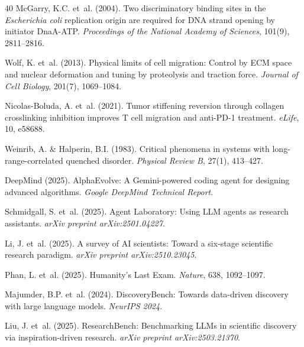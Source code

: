 \documentclass[11pt]{article}
\begin{document}
\begin{thebibliography}{40}
McGarry, K.C. et~al. (2004).
Two discriminatory binding sites in the \textit{Escherichia coli} replication origin are required for DNA strand opening by initiator DnaA-ATP.
\emph{Proceedings of the National Academy of Sciences}, 101(9), 2811--2816.

Wolf, K. et~al. (2013).
Physical limits of cell migration: Control by ECM space and nuclear deformation and tuning by proteolysis and traction force.
\emph{Journal of Cell Biology}, 201(7), 1069--1084.

Nicolas-Boluda, A. et~al. (2021).
Tumor stiffening reversion through collagen crosslinking inhibition improves T cell migration and anti-PD-1 treatment.
\emph{eLife}, 10, e58688.

Weinrib, A. \& Halperin, B.I. (1983).
Critical phenomena in systems with long-range-correlated quenched disorder.
\emph{Physical Review B}, 27(1), 413--427.

DeepMind (2025).
AlphaEvolve: A Gemini-powered coding agent for designing advanced algorithms.
\emph{Google DeepMind Technical Report}.

Schmidgall, S. et~al. (2025).
Agent Laboratory: Using LLM agents as research assistants.
\emph{arXiv preprint arXiv:2501.04227}.

Li, J. et~al. (2025).
A survey of AI scientists: Toward a six-stage scientific research paradigm.
\emph{arXiv preprint arXiv:2510.23045}.

Phan, L. et~al. (2025).
Humanity's Last Exam.
\emph{Nature}, 638, 1092--1097.

Majumder, B.P. et~al. (2024).
DiscoveryBench: Towards data-driven discovery with large language models.
\emph{NeurIPS 2024}.

Liu, J. et~al. (2025).
ResearchBench: Benchmarking LLMs in scientific discovery via inspiration-driven research.
\emph{arXiv preprint arXiv:2503.21370}.

\end{thebibliography}
\end{document}
